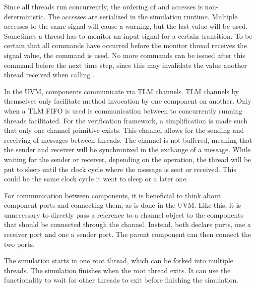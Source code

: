 Since all threads run concurrently, the ordering of  and  accesses is non-deterministic. The
accesses are serialized in the simulation runtime. Multiple  accesses to the same signal will cause a
warning, but the last value will be used. Sometimes a thread has to monitor an input signal for a certain transition.
To be certain that all  commands have occurred before the monitor thread receives the signal value, the
 command is used. No more  commands can be issued after this command before the next time
step, since this may invalidate the value another thread received when calling .

In the UVM, components communicate via TLM channels. TLM channels by themselves only facilitate method invocation by
one component on another. Only when a TLM FIFO is used is communication between to concurrently running threads
facilitated. For the verification framework, a simplification is made such that only one channel primitive exists. This
channel allows for the sending and receiving of messages between threads. The channel is not buffered, meaning that the
sender and receiver will be synchronized
in the exchange of a message. While waiting for the sender or receiver, depending on the operation, the thread will
be put to sleep until the clock cycle where the message is sent or received. This could be the same clock cycle it
went to sleep or a later one.

For communication between components, it is beneficial to think about component ports and connecting
them, as is done in the UVM. Like this, it is unnecessary to directly pass a reference to a channel object to
the components that should be connected through the channel. Instead, both declare ports, one a receiver port and
one a sender port. The parent component can then connect the two ports.

The simulation starts in one root thread, which can be forked into multiple threads. The simulation finishes when the
root thread exits. It can use the  functionality to wait for other threads to exit before finishing the simulation.

